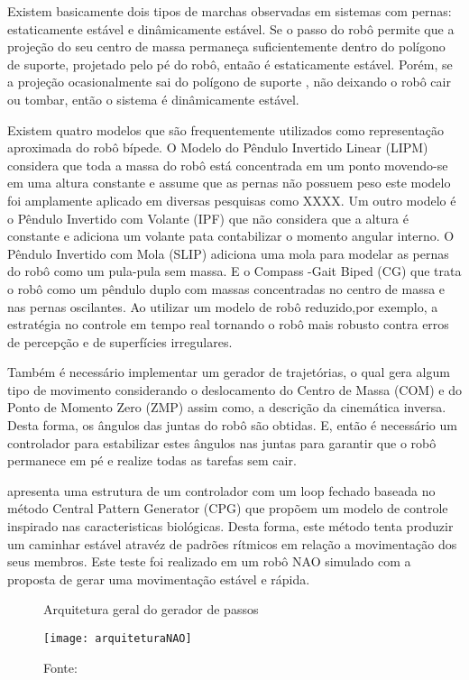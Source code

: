 Existem basicamente dois tipos de marchas observadas em sistemas com pernas:  estaticamente estável e  dinâmicamente estável. Se o passo do robô permite que a projeção do seu centro de massa permaneça suficientemente dentro do polígono de suporte, projetado pelo pé do robô, entaão é estaticamente estável. Porém, se a projeção ocasionalmente sai do polígono de suporte , não deixando o robô cair ou tombar, então o sistema é dinâmicamente estável.

Existem quatro modelos que são frequentemente utilizados como representação aproximada do robô bípede. O Modelo do Pêndulo Invertido Linear (LIPM) considera que toda a massa do robô está concentrada em um ponto movendo-se em uma altura constante e assume que as pernas não possuem peso este modelo foi amplamente aplicado em diversas pesquisas como XXXX. Um outro modelo é o Pêndulo Invertido com Volante (IPF) que não considera que a altura é constante e adiciona um volante pata contabilizar o momento angular interno. O Pêndulo Invertido com Mola (SLIP) adiciona uma mola para modelar as pernas do robô como um pula-pula sem massa. E o Compass -Gait Biped (CG) que trata o robô como um pêndulo duplo com massas concentradas no centro de massa e nas pernas oscilantes.\cite{Grizzle20141955} Ao utilizar um modelo de robô reduzido,por exemplo, \cite{Wahrmann20171471} a estratégia no controle em tempo real tornando o robô mais robusto contra erros de percepção e de superfícies irregulares. 

Também é necessário implementar um gerador de trajetórias, o qual gera algum tipo de movimento considerando o deslocamento do Centro de Massa (COM) e do Ponto de Momento Zero (ZMP) assim como, a descrição da cinemática inversa. Desta forma, os ângulos das juntas do robô são obtidas. E, então é necessário um controlador para estabilizar estes ângulos nas juntas para garantir que o robô permanece em pé e realize todas as tarefas sem cair. \cite{Kashyap2021306}

 apresenta uma estrutura de um controlador com um loop fechado baseada no método Central Pattern Generator (CPG) que propõem um modelo de controle inspirado nas caracteristicas biológicas. Desta forma, este método tenta produzir um caminhar estável atravéz de padrões rítmicos em relação a movimentação dos seus membros. Este teste foi realizado em um robô NAO simulado com a proposta de gerar uma movimentação estável e rápida.

\begin{figure} [H]
    \centering
    \caption{Arquitetura geral do gerador de passos}
    \texttt{[image: arquiteturaNAO]}
    \caption*{Fonte: \cite{Kasaei2018743}}
    \label{fig:arquitetura-nao}
\end{figure}

